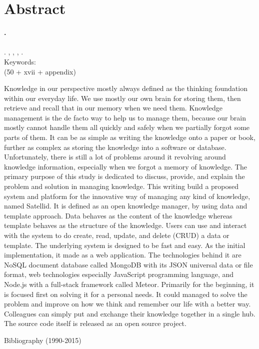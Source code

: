 
\begingroup
\let\clearpage\relax
\let\cleardoublepage\relax

\label{chap:abstract}
\chapter{Abstract}

\textbf{\myName.} \myNPM \\
\textbf{\myTitle} \\
\textbf{\myThesisType}. \myDepartmentLong, \myFacultyLong, \myUni, \myYear. \\
Keywords: \myKeywords \\
(50 + xvii + appendix)

\hfill

\singlespacing

Knowledge in our perspective mostly always defined as the thinking foundation within our everyday life.
We use mostly our own brain for storing them, then retrieve and recall that in our memory when we need them.
Knowledge management is the de facto way to help us to manage them, because our brain mostly cannot handle them all quickly and safely when we partially forgot some parts of them.
It can be as simple as writing the knowledge onto a paper or book, further as complex as storing the knowledge into a software or database.
Unfortunately, there is still a lot of problems around it revolving around knowledge information, especially when we forgot a memory of knowledge.
The primary purpose of this study is dedicated to discuss, provide, and explain the problem and solution in managing knowledge.
This writing build a proposed system and platform for the innovative way of managing any kind of knowledge, named Satellid.
It is defined as an open knowledge manager, by using data and template approach.
Data behaves as the content of the knowledge whereas template behaves as the structure of the knowledge.
Users can use and interact with the system to do create, read, update, and delete (CRUD) a data or template.
The underlying system is designed to be fast and easy.
As the initial implementation, it made as a web application.
The technologies behind it are NoSQL document database called MongoDB with its JSON universal data or file format, web technologies especially JavaScript programming language, and Node.js with a full-stack framework called Meteor.
Primarily for the beginning, it is focused first on solving it for a personal needs.
It could managed to solve the problem and improve on how we think and remember our life with a better way.
Colleagues can simply put and exchange their knowledge together in a single hub.
The source code itself is released as an open source project.

\onehalfspacing

\hfill


\noindent Bibliography (1990-2015)



\endgroup

\vfill

